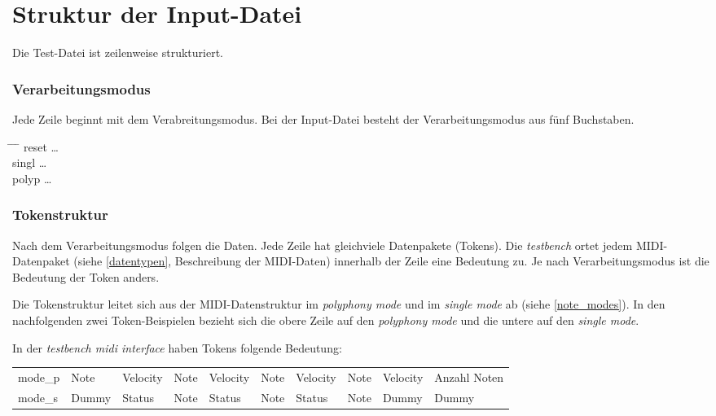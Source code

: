 \section{Struktur der Input-Datei}\label{sec.testbench_inputdatei} 

Die Test-Datei ist zeilenweise strukturiert.

\subsubsection{Verarbeitungsmodus} 
Jede Zeile beginnt mit dem Verabreitungsmodus. Bei der Input-Datei besteht der Verarbeitungsmodus aus fünf Buchstaben.

\begin{tabbing}
\hspace{4em} \= \hspace{2em} \= \hspace{2em} \=\kill
reset	  \> \ldots{}\\
singl	  \> \ldots{}\\
polyp	  \> \ldots{}
\end{tabbing}

\subsubsection{Tokenstruktur} 

Nach dem Verarbeitungsmodus folgen die Daten. Jede Zeile hat gleichviele Datenpakete (Tokens). 
Die \textit{testbench} ortet jedem MIDI-Datenpaket (siehe \ref {datentypen}, Beschreibung der MIDI-Daten) innerhalb der Zeile eine Bedeutung zu. Je nach Verarbeitungsmodus ist die Bedeutung der Token anders.

Die Tokenstruktur leitet sich aus der MIDI-Datenstruktur im \textit{polyphony mode} und im \textit{single mode} ab (siehe  \ref{note_modes}). In den nachfolgenden zwei Token-Beispielen bezieht sich die obere Zeile auf den \textit{polyphony mode} und die untere auf den \textit{single mode}.

In der \textit{testbench midi interface} haben Tokens folgende Bedeutung:


{
\renewcommand{\arraystretch}{1.0} %
\begin{tabular}{@{}*{10}{l}@{}} %
mode\_p	& Note & Velocity	& Note & Velocity & Note & Velocity & Note & Velocity & Anzahl Noten \\
mode\_s	& Dummy & Status & Note & Status & Note & Status & Note & Dummy & Dummy
\end{tabular}
}

